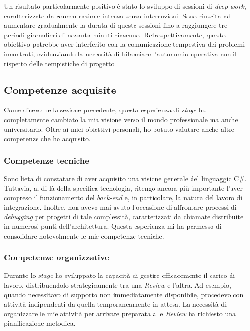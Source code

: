         \vspace{0.2 em}
        \noindent Un risultato particolarmente positivo è stato lo sviluppo di sessioni di \textit{deep work}, caratterizzate da concentrazione intensa senza interruzioni. Sono riuscita ad aumentare gradualmente la durata di queste sessioni fino a raggiungere tre periodi giornalieri di novanta minuti ciascuno. Retrospettivamente, questo obiettivo potrebbe aver interferito con la comunicazione tempestiva dei problemi incontrati, evidenziando la necessità di bilanciare l'autonomia operativa con il rispetto delle tempistiche di progetto.
        
    \subsection{Competenze acquisite}
    Come dicevo nella sezione precedente, questa esperienza di \textit{stage} ha completamente cambiato la mia visione verso il mondo professionale ma anche universitario. Oltre ai miei obiettivi personali, ho potuto valutare anche altre competenze che ho acquisito. 

    \subsubsection{Competenze tecniche}
    Sono lieta di constatare di aver acquisito una visione generale del linguaggio C\#. Tuttavia, al di là della specifica tecnologia, ritengo ancora più importante l'aver compreso il funzionamento del \textit{back-end} e, in particolare, la natura del lavoro di integrazione. Inoltre, non avevo mai avuto l'occasione di affrontare processi di \textit{debugging} per progetti di tale complessità, caratterizzati da chiamate distribuite in numerosi punti dell'architettura. Questa esperienza mi ha permesso di consolidare notevolmente le mie competenze tecniche.

    \subsubsection{Competenze organizzative}
    Durante lo \textit{stage} ho sviluppato la capacità di gestire efficacemente il carico di lavoro, distribuendolo strategicamente tra una \textit{Review} e l'altra. Ad esempio, quando necessitavo di supporto non immediatamente disponibile, procedevo con attività indipendenti da quella temporaneamente in attesa. La necessità di organizzare le mie attività per arrivare preparata alle \textit{Review} ha richiesto una pianificazione metodica. 
    
